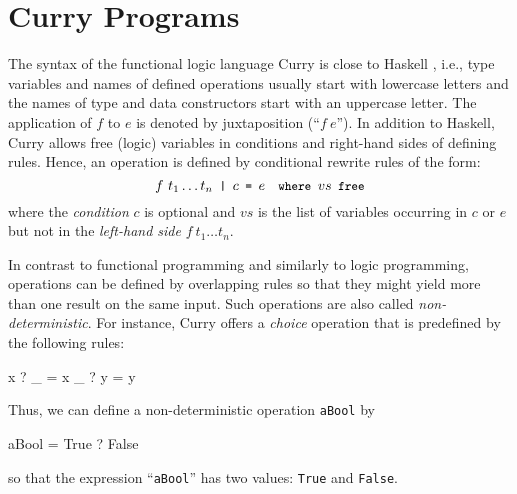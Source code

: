 \documentclass{llncs}
\newcommand{\code}[1]{\mbox{\small\texttt{#1}}}
\newcommand{\ccode}[1]{``\code{#1}''}
\begin{document}
\section{Curry Programs}
\label{sec:Curry}

The syntax of the functional logic language Curry \cite{Hanus06Curry}
is close to Haskell \cite{PeytonJones03Haskell},
i.e., type variables and names of defined operations usually
start with lowercase letters and the names of type and data constructors
start with an uppercase letter. The application of $f$
to $e$ is denoted by juxtaposition (``$f~e$'').
In addition to Haskell, Curry allows free (logic)
variables in conditions and right-hand sides of defining rules.
Hence, an operation is defined by conditional rewrite rules of the form:
%
\begin{equation}
\label{rule}
f~t_1 \ldots t_n \code{~|~} c \code{~=~} e \code{~~where~} vs \code{~free}
\end{equation}
where the \emph{condition} $c$ is optional and
$vs$ is the list of variables occurring in $c$ or $e$ but not in the
\emph{left-hand side} $f~t_1 \ldots t_n$.

In contrast to functional programming and similarly to logic programming,
operations can be defined by overlapping rules so that
they might yield more than one result on the same input.
Such operations are also called \emph{non-deterministic}.
For instance, Curry offers a \emph{choice} operation that is predefined by
the following rules:
%
\begin{curry}
  x ? _ = x
  _ ? y = y
\end{curry}
%
Thus, we can define a non-deterministic operation \code{aBool} by
\label{ex:aBool}
%
\begin{curry}
  aBool = True ? False
\end{curry}
%
so that the expression \ccode{aBool} has two values:
\code{True} and \code{False}.
\end{document}
